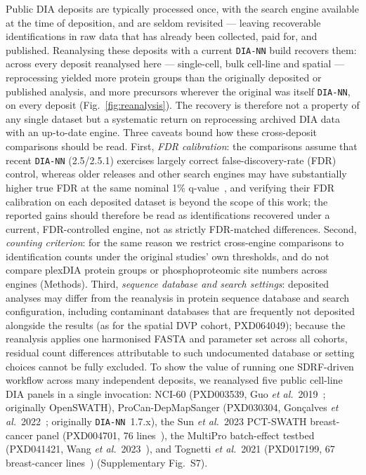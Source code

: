\documentclass[preprint,12pt]{elsarticle}
\begin{document}
Public DIA deposits are typically processed once, with the search engine available at the time of deposition, and are seldom revisited --- leaving recoverable identifications in raw data that has already been collected, paid for, and published. Reanalysing these deposits with a current \texttt{DIA-NN} build recovers them: across every deposit reanalysed here --- single-cell, bulk cell-line and spatial --- reprocessing yielded more protein groups than the originally deposited or published analysis, and more precursors wherever the original was itself \texttt{DIA-NN}, on every deposit (Fig.~\ref{fig:reanalysis}). The recovery is therefore not a property of any single dataset but a systematic return on reprocessing archived DIA data with an up-to-date engine. Three caveats bound how these cross-deposit comparisons should be read. First, \emph{FDR calibration}: the comparisons assume that recent \texttt{DIA-NN} (2.5/2.5.1) exercises largely correct false-discovery-rate (FDR) control, whereas older releases and other search engines may have substantially higher true FDR at the same nominal 1\% q-value~\cite{wen2025fdr,krull2024singlecell}, and verifying their FDR calibration on each deposited dataset is beyond the scope of this work; the reported gains should therefore be read as identifications recovered under a current, FDR-controlled engine, not as strictly FDR-matched differences. Second, \emph{counting criterion}: for the same reason we restrict cross-engine comparisons to identification counts under the original studies' own thresholds, and do not compare plexDIA protein groups or phosphoproteomic site numbers across engines (Methods). Third, \emph{sequence database and search settings}: deposited analyses may differ from the reanalysis in protein sequence database and search configuration, including contaminant databases that are frequently not deposited alongside the results (as for the spatial DVP cohort, PXD064049); because the reanalysis applies one harmonised FASTA and parameter set across all cohorts, residual count differences attributable to such undocumented database or setting choices cannot be fully excluded.
To show the value of running one SDRF-driven workflow across many independent deposits, we reanalysed five public cell-line DIA panels in a single \quantmsdiann{} invocation: NCI-60 (PXD003539, Guo \textit{et al.}~2019~\cite{guo2019nci60}; originally OpenSWATH), ProCan-DepMapSanger (PXD030304, Gon\c{c}alves \textit{et al.}~2022~\cite{goncalves2022procan}; originally \texttt{DIA-NN}~1.7.x), the Sun \textit{et al.}~2023 PCT-SWATH breast-cancer panel (PXD004701, 76 lines~\cite{sun2023breast}), the MultiPro batch-effect testbed (PXD041421, Wang \textit{et al.}~2023~\cite{wang2023multipro}), and Tognetti \textit{et al.}~2021 (PXD017199, 67 breast-cancer lines~\cite{tognetti2021breast}) (Supplementary Fig.~S7).
\end{document}
